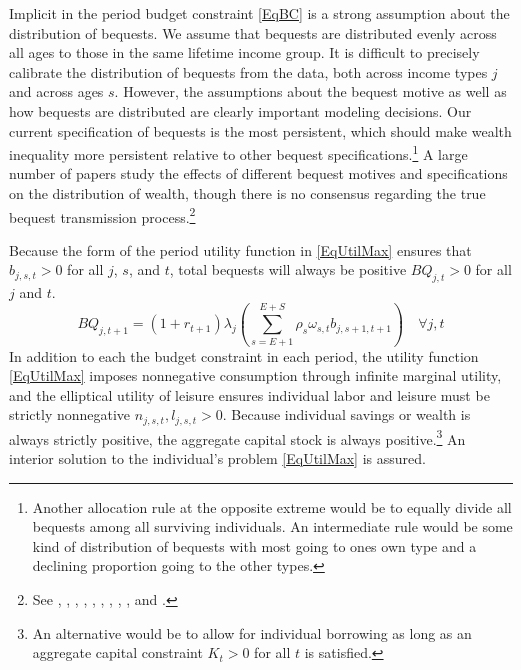 \documentclass[letterpaper,12pt]{article}
\theoremstyle{definition}
\begin{document}
\begin{spacing}{1.5}
    Implicit in the period budget constraint \eqref{EqBC} is a strong assumption about the distribution of bequests. We assume that bequests are distributed evenly across all ages to those in the same lifetime income group. It is difficult to precisely calibrate the distribution of bequests from the data, both across income types $j$ and across ages $s$. However, the assumptions about the bequest motive as well as how bequests are distributed are clearly important modeling decisions. Our current specification of bequests is the most persistent, which should make wealth inequality more persistent relative to other bequest specifications.\footnote{Another allocation rule at the opposite extreme would be to equally divide all bequests among all surviving individuals. An intermediate rule would be some kind of distribution of bequests with most going to ones own type and a declining proportion going to the other types.} A large number of papers study the effects of different bequest motives and specifications on the distribution of wealth, though there is no consensus regarding the true bequest transmission process.\footnote{See \citet{DeNardiYang:2014}, \citet{DeNardi:2004}, \citet{Nishiyama:2002}, \citet{Laitner:2001}, \citet{GokhaleEtAl:2000}, \citet{GaleScholz:1994}, \citet{Hurd:1989}, \citet{VentiWise:1988}, \citet{KotlikoffSummers:1981}, and \citet{Wolff:2015}.}

    Because the form of the period utility function in \eqref{EqUtilMax} ensures that $b_{j,s,t}>0$ for all $j$, $s$, and $t$, total bequests will always be positive $BQ_{j,t}>0$ for all $j$ and $t$.
    \begin{equation}\label{EqTotBeq}
      BQ_{j,t+1} = (1+r_{t+1})\lambda_j\left(\sum_{s=E+1}^{E+S}\rho_s\omega_{s,t}b_{j,s+1,t+1}\right) \quad\forall j,t
    \end{equation}
    In addition to each the budget constraint in each period, the utility function \eqref{EqUtilMax} imposes nonnegative consumption through infinite marginal utility, and the elliptical utility of leisure ensures individual labor and leisure must be strictly nonnegative $n_{j,s,t},l_{j,s,t}> 0$. Because individual savings or wealth is always strictly positive, the aggregate capital stock is always positive.\footnote{An alternative would be to allow for individual borrowing as long as an aggregate capital constraint $K_{t}>0$ for all $t$ is satisfied.} An interior solution to the individual's problem \eqref{EqUtilMax} is assured.


\end{spacing}
\end{document}
